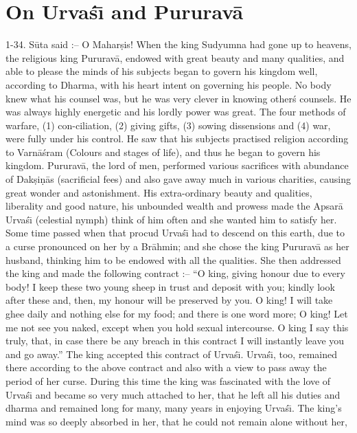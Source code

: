 \chapter{On Urva\'s\={\i} and Pururav\=a}

1-34. S\=uta said :-- O Mahar\d{s}is! When the king Sudyumna had gone up to heavens, the religious king Pururav\=a, endowed with great beauty and many qualities, and able to please the minds of his subjects began to govern his kingdom well, according to Dharma, with his heart intent on governing his people. No body knew what his counsel was, but he was very clever in knowing other\'s counsels. He was always highly energetic and his lordly power was great. The four methods of warfare, (1) con-ciliation, (2) giving gifts, (3) sowing dissensions and (4) war, were fully under his control. He saw that his subjects practised religion according to Varn\=a\'sram (Colours and stages of life), and thus he began to govern his kingdom. Pururav\=a, the lord of men, performed various sacrifices with abundance of Dak\d{s}i\d{n}\=as (sacrificial fees) and also gave away much in various charities, causing great wonder and astonishment. His extra-ordinary beauty and qualities, liberality and good nature, his unbounded wealth and prowess made the Apsar\=a Urva\'s\={\i} (celestial nymph) think of him often and she wanted him to satisfy her. Some time passed when that procud Urva\'s\={\i} had to descend on this earth, due to a curse pronounced on her by a Br\=ahmin; and she chose the king Pururav\=a as her husband, thinking him to be endowed with all the qualities. She then addressed the king and made the following contract :-- ``O king, giving honour due to every body! I keep these two young sheep in trust and deposit with you; kindly look after these and, then, my honour will be preserved by you. O king! I will take ghee daily and nothing else for my food; and there is one word more; O king! Let me not see you naked, except when you hold sexual intercourse. O king I say this truly, that, in case there be any breach in this contract I will instantly leave you and go away.'' The king accepted this contract of Urva\'s\={\i}. Urva\'s\={\i}, too, remained there according to the above contract and also with a view to pass away the period of her curse. During this time the king was fascinated with the love of Urva\'s\={\i} and became so very much attached to her, that he left all his duties and dharma and remained long for many, many years in enjoying Urva\'s\={\i}. The king's mind was so deeply absorbed in her, that he could not remain alone without her,

